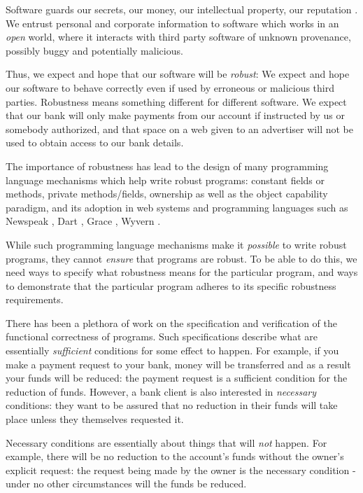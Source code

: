 Software guards our secrets, our money, our intellectual property,
our reputation \cite{covern}.  We entrust personal and
corporate information to software which works in an \emph{open} world, 
where  it interacts with %
third party software of unknown provenance, possibly buggy and potentially malicious.

Thus, we expect and hope that our software will be \emph{robust}:
We expect and hope our software to behave correctly even if  used 
by erroneous or malicious third parties. Robustness means 
something different for different software.
 We expect that our bank will only make payments 
from our account if instructed by us or somebody authorized\cite{ ERC20}, 
and that  space on a web given to an advertiser will not be used
to obtain access to our bank details\cite{cwe}. 

The importance of robustness has lead to the design of many programming
language mechanisms which help write robust programs:
constant fields or methods, private methods/fields, ownership\cite{ownalias}
as well as the object capability paradigm\cite{MillerPhD},
and its adoption in  web systems
\cite{CapJavaHayesAPLAS17,CapNetSocc17Eide,DOCaT14} and programming languages such as Newspeak
\cite{newspeak17}, Dart \cite{dart15}, Grace \cite{grace,graceClasses}, Wyvern \cite{wyverncapabilities}.

While such programming language mechanisms make it \textit{possible} to write robust
programs, they cannot \textit{ensure} that programs are robust. 
To be able to do this, we need ways to specify what robustness means for the 
particular program, and ways to demonstrate that the particular program 
adheres to its specific robustness requirements.

There has been a plethora of work on the specification and verification of the
functional correctness of programs. Such specifications describe what are
essentially \emph{sufficient} conditions for some
effect to happen. For example, if you make a payment request to your bank, money will be transferred
and as a result your funds will be reduced: the payment request is a sufficient condition for the
reduction of funds. However, a bank client is also interested in \emph{necessary} conditions:
they want to be assured that no reduction in their funds will take place unless they themselves
requested it.

Necessary conditions are essentially about things that will  \emph{not} happen. For example,
there  will be no reduction to the account's funds without the owner's explicit request: the request being made by
the owner is the necessary condition - under no other circumstances will the funds be reduced.

